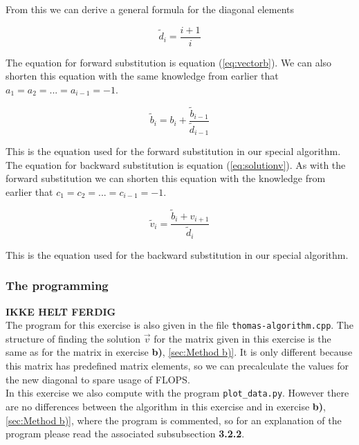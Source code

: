 \documentclass{article}
\begin{document}
    From this we can derive a general formula for the diagonal elements

    \begin{equation*}
      \tilde{d}_i = \frac{i+1}{i}
    \end{equation*}

    The equation for forward substitution is equation (\ref{eq:vectorb}). We can also shorten this equation with the same knowledge from earlier that $a_1 = a_2 = ... = a_{i-1} = -1$.

    \begin{equation*}
      \tilde{b}_i = b_i + \frac{\tilde{b}_{i-1}}{\tilde{d}_{i-1}} \label{eq:vectorbspec}
    \end{equation*}

    This is the equation used for the forward substitution in our special algorithm. \\

    The equation for backward substitution is equation (\ref{eq:solutionv}). As with the forward substitution we can shorten this equation with the knowledge from earlier that $c_1 = c_2 = ... = c_{i-1} = -1$.

    \begin{equation*}
      \tilde{v}_i = \frac{\tilde{b}_i + v_{i+1}}{\tilde{d}_i}
    \end{equation*}

    This is the equation used for the backward substitution in our special algorithm.

  \subsubsection{The programming}

  {\large \bf IKKE HELT FERDIG} \\

    The program for this exercise is also given in the file \texttt{thomas-algorithm.cpp}. The structure of finding the solution $\vec{v}$ for the matrix given in this exercise is the same as for the matrix in exercise \textbf{b)}, \ref{sec:Method b)}. It is only different because this matrix has predefined matrix elements, so we can precalculate the values for the new diagonal to spare usage of FLOPS. \\

    In this exercise we also compute with the program \texttt{plot\_data.py}. However there are no differences between the algorithm in this exercise and in exercise \textbf{b)}, \ref{sec:Method b)}, where the program is commented, so for an explanation of the program please read the associated subsubsection \textbf{3.2.2}. \\
\end{document}
